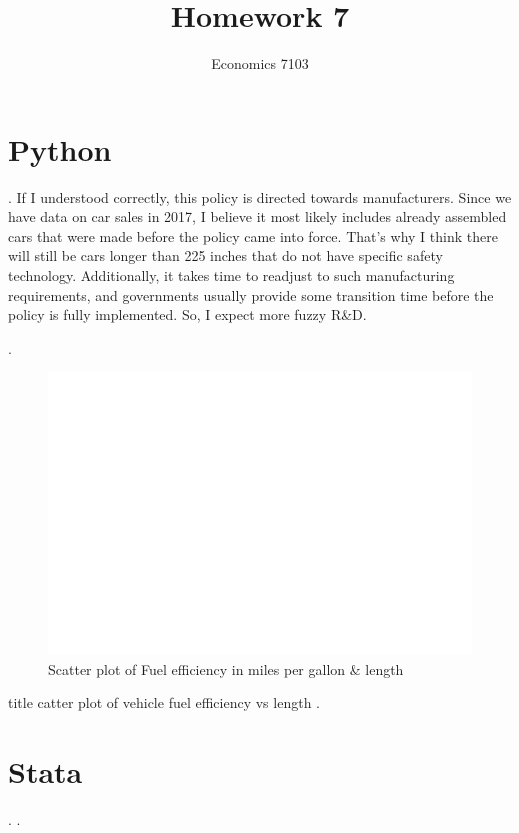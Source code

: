 \documentclass{article}
\title{Homework 7}
\author{Economics 7103}
\begin{document}
  
\maketitle

\section{Python}
. If I understood correctly, this policy is directed towards manufacturers. Since we have data on car sales in 2017, I believe it most likely includes already assembled cars that were made before the policy came into force. That's why I think there will still be cars longer than 225 inches that do not have specific safety technology. Additionally, it takes time to readjust to such manufacturing requirements, and governments usually provide some transition time before the policy is fully implemented. So, I expect more fuzzy R\&D.

.

\begin{figure}
    \centering
    \includegraphics{homework 7/output/figure/satterplot.pdf}
    \caption{Scatter plot of Fuel efficiency in miles per gallon \& length}
    \label{fig:scatterplot1}
\end{figure}


title catter plot of vehicle fuel efficiency vs length
. 

\section{Stata}

.
. 
\end{document}
